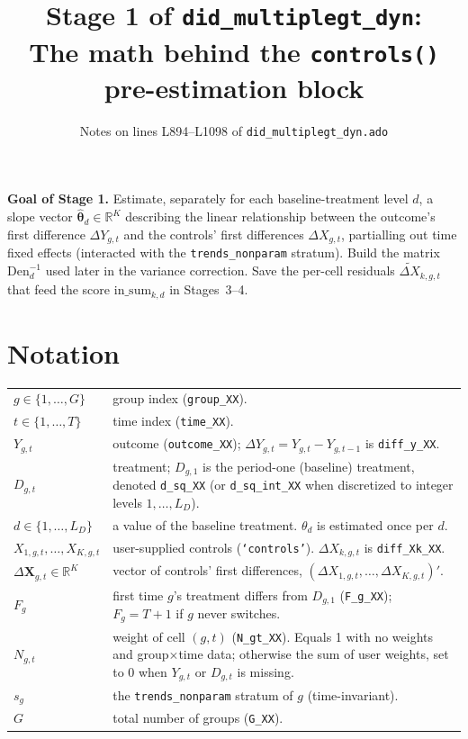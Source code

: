 \documentclass[11pt]{article}
\title{\textbf{Stage 1 of \texttt{did\_multiplegt\_dyn}}: \\[2pt]
       \large The math behind the \texttt{controls()} pre-estimation block}
\author{Notes on lines L894--L1098 of \texttt{did\_multiplegt\_dyn.ado}}
\date{}
\newcommand{\code}[1]{\texttt{\small #1}}
\newcommand{\R}{\mathbb{R}}
\newcommand{\1}{\mathbb{1}}
\newcommand{\thetad}{\widehat{\bm{\theta}}_d}
\newcommand{\Ngt}{N_{g,t}}
\newcommand{\dY}{\Delta Y_{g,t}}
\newcommand{\dX}{\Delta X_{g,t}}
\newcommand{\dXk}{\Delta X_{k,g,t}}
\begin{document}
\maketitle

\noindent
\begin{tcolorbox}[colback=codebg, colframe=navy, boxrule=0.6pt, arc=1pt]
\textbf{Goal of Stage 1.} Estimate, separately for each baseline-treatment
level $d$, a slope vector $\thetad \in \R^{K}$ describing the linear
relationship between the outcome's first difference $\dY$ and the controls'
first differences $\dX$, partialling out time fixed effects (interacted with
the \texttt{trends\_nonparam} stratum). Build the matrix $\mathrm{Den}_d^{-1}$
used later in the variance correction. Save the per-cell residuals
$\widetilde{\Delta X}_{k,g,t}$ that feed the score
$\mathrm{in\_sum}_{k,d}$ in Stages~3--4.
\end{tcolorbox}

\section{Notation}

\noindent
\begin{tabular}{@{}p{4.6cm}p{10.4cm}@{}}
\toprule
$g \in \{1,\dots,G\}$ & group index (\code{group\_XX}).\\
$t \in \{1,\dots,T\}$ & time index (\code{time\_XX}).\\
$Y_{g,t}$ & outcome (\code{outcome\_XX}); $\dY = Y_{g,t}-Y_{g,t-1}$ is \code{diff\_y\_XX}.\\
$D_{g,t}$ & treatment; $D_{g,1}$ is the period-one (baseline) treatment, denoted \code{d\_sq\_XX} (or \code{d\_sq\_int\_XX} when discretized to integer levels $1,\dots,L_D$).\\
$d \in \{1,\dots,L_D\}$ & a value of the baseline treatment. $\theta_d$ is estimated once per $d$.\\
$X_{1,g,t}, \dots, X_{K,g,t}$ & user-supplied controls (\code{`controls'}). $\dXk$ is \code{diff\_X{k}\_XX}.\\
$\Delta\bm{X}_{g,t}\in\R^K$ & vector of controls' first differences, $(\Delta X_{1,g,t},\dots,\Delta X_{K,g,t})'$.\\
$F_g$ & first time $g$'s treatment differs from $D_{g,1}$ (\code{F\_g\_XX}); $F_g = T+1$ if $g$ never switches.\\
$\Ngt$ & weight of cell $(g,t)$ (\code{N\_gt\_XX}). Equals 1 with no weights and group$\times$time data; otherwise the sum of user weights, set to 0 when $Y_{g,t}$ or $D_{g,t}$ is missing.\\
$s_g$ & the \texttt{trends\_nonparam} stratum of $g$ (time-invariant).\\
$G$ & total number of groups (\code{G\_XX}).\\
\bottomrule
\end{tabular}
\end{document}
